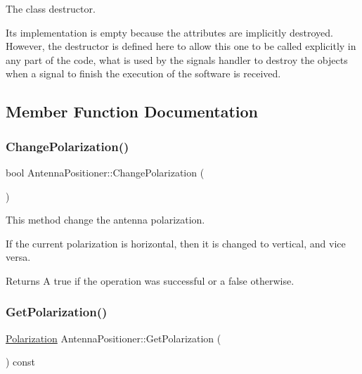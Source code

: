 The class destructor. 

Its implementation is empty because the attributes are implicitly destroyed. However, the destructor is defined here to allow this one to be called explicitly in any part of the code, what is used by the signals handler to destroy the objects when a signal to finish the execution of the software is received. 

\subsection{Member Function Documentation}
\mbox{\label{classAntennaPositioner_a0e4f58f67280f2a6daa10c7cc02f0abd}} 
\subsubsection{\texorpdfstring{Change\+Polarization()}{ChangePolarization()}}
{\footnotesize\ttfamily bool Antenna\+Positioner\+::\+Change\+Polarization (\begin{DoxyParamCaption}{ }\end{DoxyParamCaption})}



This method change the antenna polarization. 

If the current polarization is horizontal, then it is changed to vertical, and vice versa. \begin{DoxyReturn}{Returns}
A {\ttfamily true} if the operation was successful or a {\ttfamily false} otherwise. 
\end{DoxyReturn}
\mbox{\label{classAntennaPositioner_a590e07740567be77f677d822cf63b69a}} 
\subsubsection{\texorpdfstring{Get\+Polarization()}{GetPolarization()}}
{\footnotesize\ttfamily \hyperlink{AntennaPositioning_8h_a55887c7bc32d70c0308472ff4de3e282}{Polarization} Antenna\+Positioner\+::\+Get\+Polarization (\begin{DoxyParamCaption}{ }\end{DoxyParamCaption}) const}



